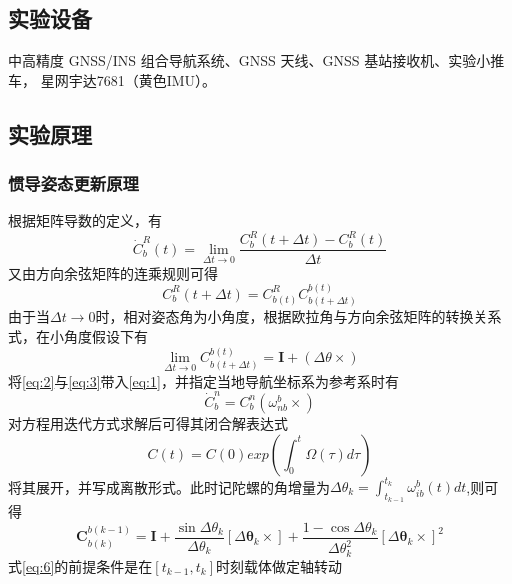 \documentclass{ctexart}
\begin{document}
\subsection{实验设备}
中高精度 GNSS/INS 组合导航系统、GNSS 天线、GNSS 基站接收机、实验小推车，
星网宇达7681（黄色IMU）。
\subsection{实验原理}
\label{1.3}
\subsubsection{惯导姿态更新原理}
根据矩阵导数的定义，有
\begin{equation}
\dot{C}^{R}_{b}(t)=\lim_{\Delta t\rightarrow 0}\frac{C^R_b(t+\Delta t)-C^R_b(t)}{\Delta t}
\label{eq:1}
\end{equation}
又由方向余弦矩阵的连乘规则可得
\begin{equation}
C^R_b(t+\Delta t)=C^R_{b(t)}C^{b(t)}_{b(t+\Delta t)}
\label{eq:2}
\end{equation}
由于当$\Delta t\rightarrow 0$时，相对姿态角为小角度，根据欧拉角与方向余弦矩阵的转换关系式，在小角度假设下有
\begin{equation}
\lim_{\Delta t\rightarrow 0}C^{b(t)}_{b(t+\Delta t)}=\mathbf{I}+(\Delta \theta\times)
\label{eq:3}
\end{equation}
将\eqref{eq:2}与\eqref{eq:3}带入\eqref{eq:1}，并指定当地导航坐标系为参考系时有
\begin{equation}
\dot{C}^n_b=C^n_b(\omega^b_{nb}\times)
\label{eq:4}
\end{equation}
对方程用迭代方式求解后可得其闭合解表达式
\begin{equation}
C(t)=C(0)exp\left(\int^t_0 \Omega(\tau)d\tau\right)
\label{eq:5}
\end{equation}
将其展开，并写成离散形式。此时记陀螺的角增量为$\Delta\theta_k=\int^{t_k}_{t_{k-1}}\omega^b_{ib}(t)dt$,则可得
\begin{equation}
\mathbf{C}_{b(k)}^{b(k-1)}=\mathbf{I}+\frac{\sin \Delta \theta_{k}}{\Delta \theta_{k}}\left[\Delta \boldsymbol{\theta}_{k} \times\right]+\frac{1-\cos \Delta \theta_{k}}{\Delta \theta_{k}^{2}}\left[\Delta \boldsymbol{\theta}_{k} \times\right]^{2}
\label{eq:6}
\end{equation}
式\eqref{eq:6}的前提条件是在$[t_{k-1},t_k]$时刻载体做定轴转动
\end{document}
